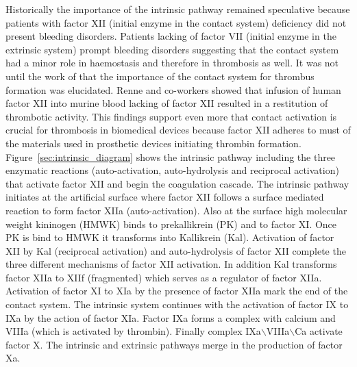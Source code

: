 \documentclass[%
 nofootinbib,
 amsmath,amssymb,
 aps,
 pra,
]{revtex4-1}
\begin{document}
Historically the importance of the intrinsic pathway remained speculative because patients with factor XII (initial enzyme in the contact system) deficiency did not present bleeding disorders. Patients lacking of factor VII (initial enzyme in the extrinsic system) prompt bleeding disorders suggesting that the contact system had a minor role in haemostasis and therefore in thrombosis as well. It was not until the work of \citet{Renne:2005} that the importance of the contact system for thrombus formation was elucidated. Renne and co-workers showed that infusion of human factor XII into murine blood lacking of factor XII resulted in a restitution of thrombotic activity. This findings support even more that contact activation is crucial for thrombosis in biomedical devices because factor XII adheres to must of the materials used in prosthetic devices initiating thrombin formation.\\

Figure~\ref{sec:intrinsic_diagram} shows the intrinsic pathway including the three enzymatic reactions (auto-activation, auto-hydrolysis and reciprocal activation) that activate factor XII and begin the coagulation cascade. The intrinsic pathway initiates at the artificial surface where factor XII follows a surface mediated reaction to form factor XIIa (auto-activation). Also at the surface %
high molecular weight kininogen (HMWK) binds to prekallikrein %
 (PK) and to factor XI. Once PK is bind to HMWK it transforms into %
Kallikrein (Kal). Activation of factor XII by Kal (reciprocal activation) and auto-hydrolysis of factor XII complete the three different mechanisms of factor XII activation. In addition Kal transforms factor XIIa to XIIf (fragmented) which serves as a regulator of factor XIIa. Activation of factor XI to XIa by the presence of factor XIIa mark the end of the contact system. The intrinsic system continues with the activation of factor IX to IXa by the action of factor XIa. Factor IXa forms a complex with calcium and VIIIa (which is activated by thrombin). Finally complex IXa$\backslash$VIIIa$\backslash$Ca activate factor X. The intrinsic and extrinsic pathways merge in the production of factor Xa. \\
\end{document}
